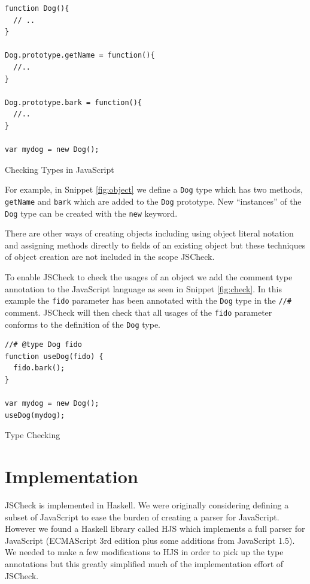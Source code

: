 \documentclass{article}
\begin{document}
\begin{program}[here]
\begin{verbatim}
function Dog(){
  // ..
}

Dog.prototype.getName = function(){
  //..
}

Dog.prototype.bark = function(){
  //..
}

var mydog = new Dog();
\end{verbatim}
\caption{Checking Types in JavaScript}
\label{fig:object}
\end{program}
\pagebreak

For example, in Snippet \ref{fig:object} we define a {\tt Dog} type
which has two methods, {\tt getName} and {\tt bark} which are added to the {\tt Dog}
prototype. New ``instances'' of the {\tt Dog} type can be created with the {\tt new}
keyword.

There are other ways of creating objects including using object literal notation
and assigning methods directly to fields of an existing object but these techniques of 
object creation are not included in the scope JSCheck.

To enable JSCheck to check the usages of an object we add the comment type annotation
to the JavaScript language as seen in Snippet \ref{fig:check}. In
this example the {\tt fido} parameter has been annotated with the {\tt Dog}
type in the {\tt //\#} comment. JSCheck will then check that all usages of
the {\tt fido} parameter conforms to the definition of the {\tt Dog} type.

\begin{program}[here]
\begin{verbatim}
//# @type Dog fido
function useDog(fido) {
  fido.bark();
}

var mydog = new Dog();
useDog(mydog);
\end{verbatim}
\caption{Type Checking}
\label{fig:check}
\end{program}
\pagebreak

\section{Implementation}
\label{sec:implementation}
JSCheck is implemented in Haskell. We were originally considering defining a 
subset of JavaScript to ease the burden of creating a parser for JavaScript. 
However we found a Haskell library called HJS \cite{hjsLibrary} 
which implements a full parser for JavaScript (ECMAScript 3rd edition plus 
some additions from JavaScript 1.5). We needed to make a few modifications to
HJS in order to pick up the type annotations but this greatly simplified much of
the implementation effort of JSCheck.
\end{document}
